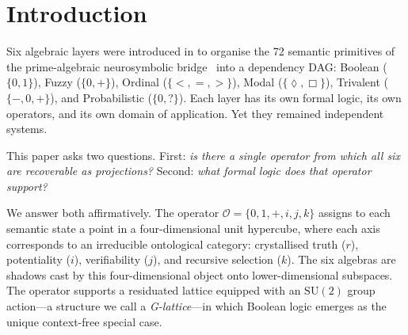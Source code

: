 \documentclass[11pt,a4paper]{article}
\newcommand{\Op}{\mathcal{O}}
\newcommand{\rey}[1]{{\color{rcolor}#1}}
\newcommand{\imag}[1]{{\color{icolor}#1}}
\newcommand{\exac}[1]{{\color{jcolor}#1}}
\newcommand{\recu}[1]{{\color{kcolor}#1}}
\newcommand{\SU}{\mathrm{SU}(2)}
\def\rey#1{#1}%
\def\imag#1{#1}%
\def\exac#1{#1}%
\def\recu#1{#1}%
\begin{document}
\section{Introduction}
\label{sec:intro}

Six algebraic layers were introduced in \citet{p4} to organise the
72 semantic primitives of the prime-algebraic neurosymbolic
bridge~\citep{p1} into a dependency DAG: Boolean ($\{0,1\}$), Fuzzy
($\{0,+\}$), Ordinal ($\{<,=,>\}$), Modal ($\{\lozenge,\Box\}$),
Trivalent ($\{-,0,+\}$), and Probabilistic ($\{0,?\}$). Each layer
has its own formal logic, its own operators, and its own domain of
application. Yet they remained independent systems.

This paper asks two questions. First: \emph{is there a single
operator from which all six are recoverable as projections?}
Second: \emph{what formal logic does that operator support?}

We answer both affirmatively. The operator
$\Op=\{0,1,+,\imag{i},\exac{j},\recu{k}\}$ assigns to each
semantic state a point in a four-dimensional unit hypercube, where
each axis corresponds to an irreducible ontological category:
crystallised truth ($\rey{r}$), potentiality ($\imag{i}$),
verifiability ($\exac{j}$), and recursive selection ($\recu{k}$).
The six algebras are shadows cast by this four-dimensional object
onto lower-dimensional subspaces. The operator supports a residuated
lattice equipped with an $\SU$ group action---a structure we call a
\emph{G-lattice}---in which Boolean logic emerges as the unique
context-free special case.
\end{document}

